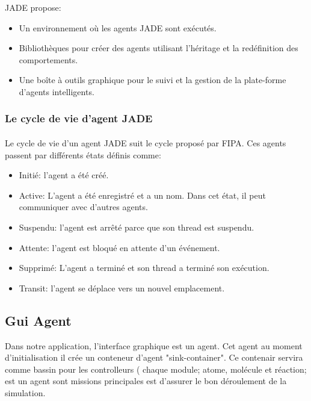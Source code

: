 JADE propose:
\begin{itemize}
    \item Un environnement où les agents JADE sont exécutés.
    \item Bibliothèques pour créer des agents utilisant l'héritage et la redéfinition des comportements.
    \item Une boîte à outils graphique pour le suivi et la gestion de la plate-forme d'agents intelligents.

\end{itemize}
    

\subsubsection{Le cycle de vie d'agent JADE}
\paragraph{}
Le cycle de vie d'un agent JADE suit le cycle proposé par FIPA. Ces agents passent par différents états définis comme:
\begin{itemize}

    \item Initié: l'agent a été créé.
    \item Active: L'agent a été enregistré et a un nom. Dans cet état, il peut communiquer avec d'autres agents.
    \item Suspendu: l'agent est arrêté parce que son thread est suspendu.
    \item Attente: l'agent est bloqué en attente d'un événement.
    \item Supprimé: L'agent a terminé et son thread a terminé son exécution.
    \item Transit: l'agent se déplace vers un nouvel emplacement.
\end{itemize}

\paragraph{}
\subsection{Gui Agent}
Dans notre application, l'interface graphique est un agent. Cet agent au moment d'initialisation il crée un conteneur d'agent "sink-container". Ce contenair servira comme bassin pour les controlleurs ( chaque module; atome, molécule et réaction; est un agent sont missions principales est d'assurer le bon déroulement de la simulation.


